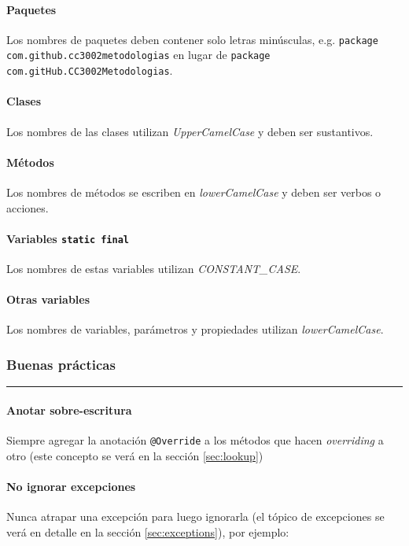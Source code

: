     \paragraph{Paquetes}
      Los nombres de paquetes deben contener solo letras minúsculas, e.g. 
      \texttt{package com.github.cc3002metodologias} en lugar de
      \texttt{package com.gitHub.CC3002Metodologias}.
    \paragraph{Clases}
      Los nombres de las clases utilizan \textit{UpperCamelCase} y deben ser sustantivos.
    \paragraph{Métodos}
      Los nombres de métodos se escriben en \textit{lowerCamelCase} y deben ser verbos o 
      acciones.
    \paragraph{Variables \texttt{static final}}
      Los nombres de estas variables utilizan \textit{CONSTANT\_CASE}.
    \paragraph{Otras variables}
      Los nombres de variables, parámetros y propiedades utilizan \textit{lowerCamelCase}.
  \subsubsection{Buenas prácticas}
    \vspace{-3ex}\rule{\linewidth}{1pt}

    \paragraph{Anotar sobre-escritura}
      Siempre agregar la anotación \texttt{@Override} a los métodos que hacen 
      \textit{overriding} a otro (este concepto se verá en la sección \ref{sec:lookup})
    \paragraph{No ignorar excepciones}
      Nunca atrapar una excepción para luego ignorarla (el tópico de excepciones se verá 
      en detalle en la sección \ref{sec:exceptions}), por ejemplo:

